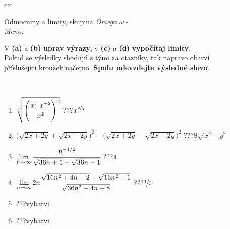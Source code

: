 \documentclass[10pt]{report}
\begin{document}
\newpage
\thispagestyle{empty}
\begin{tabular}{c:c}
\begin{minipage}[c][104.5mm][t]{0.5\linewidth}
\begin{center}
\vspace{7mm}
{\huge Odmocniny a limity, skupina \textit{Omega $\omega$} -}\\[5mm]
\textit{Meno:}\phantom{xxxxxxxxxxxxxxxxxxxxxxxxxxxxxxxxxxxxxxxxxxxxxxxxxxxxxxxxxxxxxxxxx}\\[5mm]
\begin{minipage}{0.95\linewidth}
\begin{center}
V \textbf{(a)} a \textbf{(b)} \textbf{uprav výrazy}, v \textbf{(c)} a \textbf{(d)} \textbf{vypočítaj limity}.\\Pokud se výsledky shodujú s tými za otazníky, tak napravo obarvi\\příslušející kroužek načerno. \textbf{Spolu odevzdejte výsledné slovo}.
\end{center}
\end{minipage}
\\[1mm]
\begin{minipage}{0.79\linewidth}
\begin{center}
\begin{varwidth}{\linewidth}
\begin{enumerate}
\small
\item $\sqrt[3]{\left(\cfrac{x^{1}\;x^{-2}}{x^{2}}\right)^{2}}$\quad \dotfill\; ???\;\dotfill \quad $x^{\nicefrac{2}{3}}$
\item {\footnotesize{\scriptsize$\big(\sqrt{2x+2y}+\sqrt{2x-2y}\big)^2-\big(\sqrt{2x+2y}-\sqrt{2x-2y}\big)^2$}\quad \dotfill\; ???\;\dotfill \quad $8\sqrt{x^2-y^2}$}
\item $\lim\limits_{n\to\infty}\cfrac{n^{-1/2}}{\sqrt{36n+5}-\sqrt{36n-1}}$\quad \dotfill\; ???\;\dotfill \quad $1$
\item $\lim\limits_{n\to\infty}2n\cfrac{\sqrt{16n^2+4n-2}-\sqrt{16n^2-1}}{\sqrt{36n^2-4n+8}}$\quad \dotfill\; ???\;\dotfill \quad $\nicefrac{1}{3}$
\item \quad \dotfill\; ???\;\dotfill \quad vybarvi
\item \quad \dotfill\; ???\;\dotfill \quad vybarvi
\end{enumerate}
\end{varwidth}
\end{center}
\end{minipage}
\begin{minipage}{0.20\linewidth}

\end{minipage}
\end{center}
\end{minipage}
\end{tabular}
\end{document}
